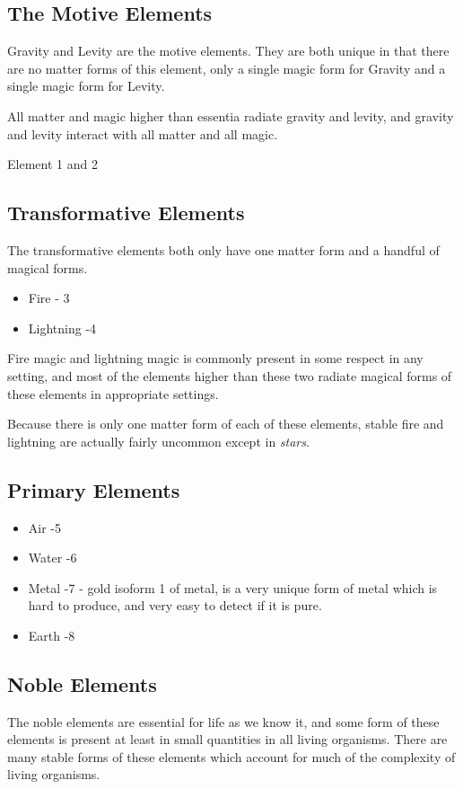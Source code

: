 \subsection{The Motive Elements}

Gravity and Levity are the motive elements. They are both unique in that there are no matter forms of this element, only a single magic form for Gravity and a single magic form for Levity.

All matter and magic higher than essentia radiate gravity and levity, and gravity and levity interact with all matter and all magic.

Element 1 and 2

\subsection{Transformative Elements}
The transformative elements both only have one matter form and a handful of magical forms.

\begin{itemize}
	\item Fire - 3
	\item Lightning -4
\end{itemize}

Fire magic and lightning magic is commonly present in some respect in any setting, and most of the elements higher than these two radiate magical forms of these elements in appropriate settings.

Because there is only one matter form of each of these elements, stable fire and lightning are actually fairly uncommon except in \emph{stars}.

\subsection{Primary Elements}

\begin{itemize}
	\item Air -5
	\item Water -6
	\item Metal -7 - gold isoform 1 of metal, is a very unique form of metal which is hard to produce, and very easy to detect if it is pure.
	\item Earth -8
\end{itemize}

\subsection{Noble Elements}
The noble elements are essential for life as we know it, and some form of these elements is present at least in small quantities in all living organisms. There are many stable forms of these elements which account for much of the complexity of living organisms.

